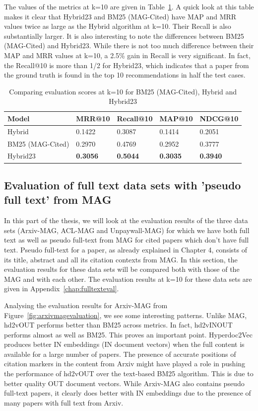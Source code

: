 The values of the metrics at k=10 are given in Table~\ref{tab:maghybridcited}. A quick look at this table makes it clear that Hybrid23 and BM25 (MAG-Cited) have MAP and MRR values twice as large as the Hybrid algorithm at k=10. Their Recall is also substantially larger. It is also interesting to note the differences between BM25 (MAG-Cited) and Hybrid23. While there is not too much difference between their MAP and MRR values at k=10, a 2.5\% gain in Recall is very significant. In fact, the Recall@10 is more than 1/2 for Hybrid23, which indicates that a paper from the ground truth is found in the top 10 recommendations in half the test cases. 
\begin{table}[]
\centering
    \caption{Comparing evaluation scores at k=10 for BM25 (MAG-Cited), Hybrid and Hybrid23}
    \label{tab:maghybridcited}
\begin{center}
    \begin{tabular}{lllll}
    \toprule
    Model & MRR@10 & Recall@10 & MAP@10 & NDCG@10 \\
    \midrule
    Hybrid  & 0.1422 & 0.3087 & 0.1414 & 0.2051 \\
    BM25 (MAG-Cited) & 0.2970 & 0.4769 & 0.2952 & 0.3777 \\
    Hybrid23  & \textbf{0.3056} & \textbf{0.5044} & \textbf{0.3035} & \textbf{0.3940} \\
    \bottomrule
    \end{tabular}
\end{center}
\end{table}
\subsection{Evaluation of full text data sets with 'pseudo full text' from MAG}
In this part of the thesis, we will look at the evaluation results of the three data sets (Arxiv-MAG, ACL-MAG and Unpaywall-MAG) for which we have both full text as well as pseudo full-text from MAG for cited papers which don't have full text. Pseudo full-text for a paper, as already explained in Chapter 4, consists of its title, abstract and all its citation contexts from MAG. 
In this section, the evaluation results for these data sets will be compared both with those of the MAG and with each other. 
The evaluation results at k=10 for these data sets are given in Appendix~\ref{chap:fulltexteval}.

Analysing the evaluation results for Arxiv-MAG from Figure~\ref{fig:arxivmagevaluation}, we see some interesting patterns. Unlike MAG, hd2vOUT performs better than BM25 across metrics. In fact, hd2vINOUT performs almost as well as BM25. This proves an important point. Hyperdoc2Vec produces better IN embeddings (IN document vectors) when the full content is available for a large number of papers. The presence of accurate positions of citation markers in the content from Arxiv might have played a role in pushing the performance of hd2vOUT over the text-based BM25 algorithm. This is due to better quality OUT document vectors. While Arxiv-MAG also contains pseudo full-text papers, it clearly does better with IN embeddings due to the presence of many papers with full text from Arxiv. 


